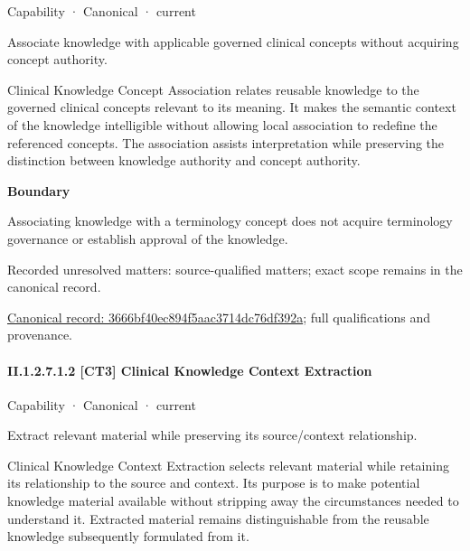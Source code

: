 \label{element:3666bf40ec894f5aac3714dc76df392a}
{\small Capability · Canonical · current}\par

Associate knowledge with applicable governed clinical concepts without acquiring concept authority.



Clinical Knowledge Concept Association relates reusable knowledge to the governed clinical concepts relevant to its meaning. It makes the semantic context of the knowledge intelligible without allowing local association to redefine the referenced concepts. The association assists interpretation while preserving the distinction between knowledge authority and concept authority.



\textbf{Boundary}



Associating knowledge with a terminology concept does not acquire terminology governance or establish approval of the knowledge.


{\small Recorded unresolved matters: source-qualified matters; exact scope remains in the canonical record.}\par
{\footnotesize \href{../../../../continuum/strategy/capability/3666bf40ec894f5aac3714dc76df392a.md}{Canonical record: 3666bf40ec894f5aac3714dc76df392a}; full qualifications and provenance.}\par
\paragraph*{II.1.2.7.1.2 [CT3] Clinical Knowledge Context Extraction}
\label{navigation:II.1.2.7.1.2}

\label{element:0911997eb4584172afd10b1d37946061}
{\small Capability · Canonical · current}\par

Extract relevant material while preserving its source/context relationship.



Clinical Knowledge Context Extraction selects relevant material while retaining its relationship to the source and context. Its purpose is to make potential knowledge material available without stripping away the circumstances needed to understand it. Extracted material remains distinguishable from the reusable knowledge subsequently formulated from it.



